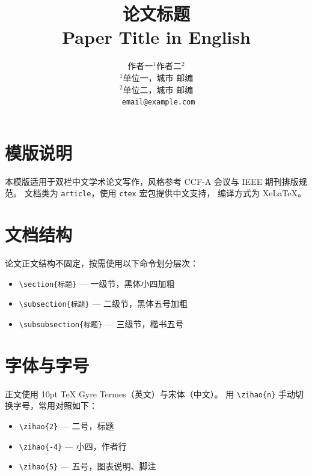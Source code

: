 \documentclass[10pt, a4paper]{article}
\title{
  \vspace{-1em}
  {\heiti\zihao{2} 论文标题}\\[4pt]
  {\zihao{-4} Paper Title in English}
}
\author{
  \zihao{-4}
  作者一$^{1}$\quad 作者二$^{2}$\\[2pt]
  \zihao{5}
  $^{1}$单位一，城市 邮编\\
  $^{2}$单位二，城市 邮编\\[2pt]
  \texttt{\zihao{5} email@example.com}
}
\date{}
\begin{document}
\maketitle
\thispagestyle{fancy}

\section{模版说明}

本模版适用于双栏中文学术论文写作，风格参考 CCF-A 会议与 IEEE 期刊排版规范。
文档类为 \texttt{article}，使用 \texttt{ctex} 宏包提供中文支持，
编译方式为 XeLaTeX。

\section{文档结构}

论文正文结构不固定，按需使用以下命令划分层次：

\begin{itemize}
  \item \verb|\section{标题}| — 一级节，黑体小四加粗
  \item \verb|\subsection{标题}| — 二级节，黑体五号加粗
  \item \verb|\subsubsection{标题}| — 三级节，楷书五号
\end{itemize}

\section{字体与字号}

正文使用 10pt TeX Gyre Termes（英文）与宋体（中文）。
用 \verb|\zihao{n}| 手动切换字号，常用对照如下：

\begin{itemize}
  \item \verb|\zihao{2}| — 二号，标题
  \item \verb|\zihao{-4}| — 小四，作者行
  \item \verb|\zihao{5}| — 五号，图表说明、脚注
\end{itemize}
\end{document}

